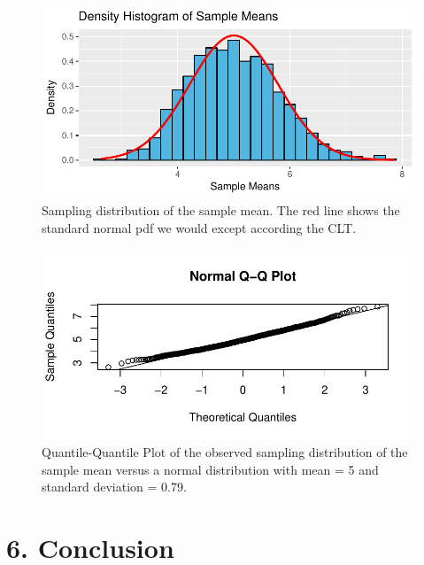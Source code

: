 \documentclass[]{article}
\begin{document}
\begin{figure}[h]

{\centering \includegraphics{exponential_distribution_files/figure-latex/plot_hist_1-1} 

}

\caption{\label{fig:fig_hist_1}Sampling distribution of the sample mean. The red line shows the standard normal pdf we would except according the CLT.}\label{fig:plot_hist_1}
\end{figure}

\begin{figure}[h]

{\centering \includegraphics{exponential_distribution_files/figure-latex/unnamed-chunk-5-1} 

}

\caption{\label{fig:fig_qqnorm}Quantile-Quantile Plot of the observed sampling distribution of the sample mean versus a normal distribution with mean = 5 and standard deviation = 0.79.}\label{fig:unnamed-chunk-5}
\end{figure}

\section{6. Conclusion}\label{conclusion}
\end{document}
